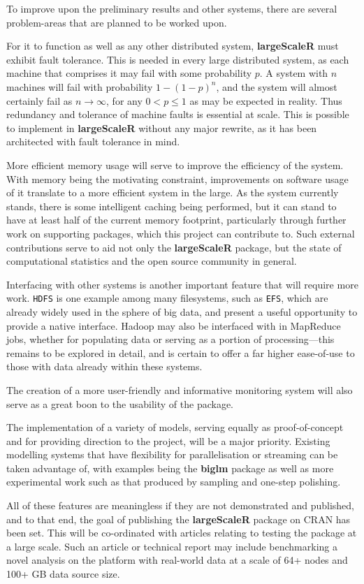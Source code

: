 To improve upon the preliminary results and other systems, there are several problem-areas that are planned to be worked upon.

For it to function as well as any other distributed system, \textbf{largeScaleR} must exhibit fault tolerance.
This is needed in every large distributed system, as each machine that comprises it may fail with some probability \(p\).
A system with \(n\) machines will fail with probability \(1-(1-p)^n\), and the system will almost certainly fail as \(n \to \infty\), for any \(0 < p \leq 1\) as may be expected in reality.
Thus redundancy and tolerance of machine faults is essential at scale.
This is possible to implement in \textbf{largeScaleR} without any major rewrite, as it has been architected with fault tolerance in mind.

More efficient memory usage will serve to improve the efficiency of the system.
With memory being the motivating constraint, improvements on software usage of it translate to a more efficient system in the large.
As the system currently stands, there is some intelligent caching being performed, but it can stand to have at least half of the current memory footprint, particularly through further work on supporting packages, which this project can contribute to.
Such external contributions serve to aid not only the \textbf{largeScaleR} package, but the state of computational statistics and the open source community in general.

Interfacing with other systems is another important feature that will require more work.
\texttt{HDFS} is one example among many filesystems, such as \texttt{EFS}, which are already widely used in the sphere of big data, and present a useful opportunity to provide a native interface.
Hadoop may also be interfaced with in MapReduce jobs, whether for populating data or serving as a portion of processing---this remains to be explored in detail, and is certain to offer a far higher ease-of-use to those with data already within these systems.

The creation of a more user-friendly and informative monitoring system will also serve as a great boon to the usability of the package.

The implementation of a variety of models, serving equally as proof-of-concept and for providing direction to the project, will be a major priority.
Existing modelling systems that have flexibility for parallelisation or streaming can be taken advantage of, with examples being the \textbf{biglm} package as well as more experimental work such as that produced by sampling and one-step polishing\cite{lumley13}\cite{lumley2019glm}.

All of these features are meaningless if they are not demonstrated and published, and to that end, the goal of publishing the \textbf{largeScaleR} package on CRAN has been set.
This will be co-ordinated with articles relating to testing the package at a large scale.
Such an article or technical report may include benchmarking a novel analysis on the platform with real-world data at a scale of 64+ nodes and 100+ GB data source size.

